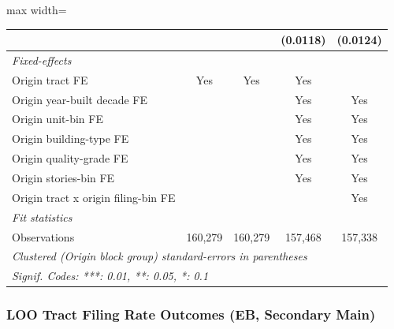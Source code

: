 \documentclass[
  11pt,
]{article}
\begin{document}
\begin{adjustbox}{max width=\textwidth}
\begin{tabular}{lcccc}
                                                  &                &                & (0.0118)       & (0.0124)\\   
   \midrule
   \emph{Fixed-effects}\\
   Origin tract FE                                & Yes            & Yes            & Yes            & \\  
   Origin year-built decade FE                    &                &                & Yes            & Yes\\  
   Origin unit-bin FE                             &                &                & Yes            & Yes\\  
   Origin building-type FE                        &                &                & Yes            & Yes\\  
   Origin quality-grade FE                        &                &                & Yes            & Yes\\  
   Origin stories-bin FE                          &                &                & Yes            & Yes\\  
   Origin tract x origin filing-bin FE            &                &                &                & Yes\\  
   \midrule
   \emph{Fit statistics}\\
   Observations                                   & 160,279        & 160,279        & 157,468        & 157,338\\  
   \midrule \midrule
   \multicolumn{5}{l}{\emph{Clustered (Origin block group) standard-errors in parentheses}}\\
   \multicolumn{5}{l}{\emph{Signif. Codes: ***: 0.01, **: 0.05, *: 0.1}}\\
\end{tabular}
\par\endgroup

\end{adjustbox}

\subsubsection{LOO Tract Filing Rate Outcomes (EB, Secondary
Main)}\label{loo-tract-filing-rate-outcomes-eb-secondary-main}
\end{document}
